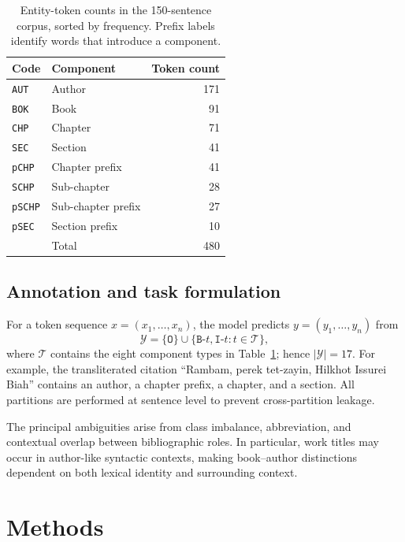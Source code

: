 \documentclass[conference,a4paper]{IEEEtran}
\begin{document}
\begin{table}[!t]
\centering
\caption{Entity-token counts in the 150-sentence corpus, sorted by frequency. Prefix labels identify words that introduce a component.}
\label{tab:labels}
\small
\begin{tabular}{@{}llr@{}}
\toprule
Code & Component & Token count \\
\midrule
\texttt{AUT} & Author & 171 \\
\texttt{BOK} & Book & 91 \\
\texttt{CHP} & Chapter & 71 \\
\texttt{SEC} & Section & 41 \\
\texttt{pCHP} & Chapter prefix & 41 \\
\texttt{SCHP} & Sub-chapter & 28 \\
\texttt{pSCHP} & Sub-chapter prefix & 27 \\
\texttt{pSEC} & Section prefix & 10 \\
\midrule
 & Total & 480 \\
\bottomrule
\end{tabular}
\end{table}

\subsection{Annotation and task formulation}

For a token sequence $x=(x_1,\ldots,x_n)$, the model predicts $y=(y_1,\ldots,y_n)$ from
\begin{equation}
\mathcal Y=\{\texttt{O}\}\cup
\{\texttt{B-}t,\texttt{I-}t:t\in\mathcal T\},
\end{equation}
where $\mathcal T$ contains the eight component types in Table~\ref{tab:labels}; hence $|\mathcal Y|=17$. For example, the transliterated citation ``Rambam, perek tet-zayin, Hilkhot Issurei Biah'' contains an author, a chapter prefix, a chapter, and a section. All partitions are performed at sentence level to prevent cross-partition leakage.

The principal ambiguities arise from class imbalance, abbreviation, and contextual overlap between bibliographic roles. In particular, work titles may occur in author-like syntactic contexts, making book--author distinctions dependent on both lexical identity and surrounding context.

\section{Methods}
\end{document}
